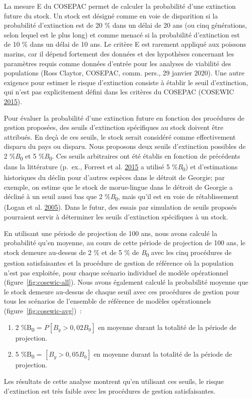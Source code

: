 \documentclass[11pt]{book}
\begin{document}
La mesure E du COSEPAC permet de calculer la probabilité d'une extinction future du stock. Un stock est désigné comme en voie de disparition si la probabilité d'extinction est de 20 \% dans un délai de 20 ans (ou cinq générations, selon lequel est le plus long) et comme menacé si la probabilité d'extinction est de 10 \% dans un délai de 10 ans. Le critère E est rarement appliqué aux poissons marins, car il dépend fortement des données et des hypothèses concernant les paramètres requis comme données d'entrée pour les analyses de viabilité des populations (Ross Claytor, COSEPAC, comm. pers., 29 janvier 2020). Une autre exigence pour estimer le risque d'extinction consiste à établir le seuil d'extinction, qui n'est pas explicitement défini dans les critères du COSEPAC (COSEWIC \protect\hyperlink{ref-cosewic2015}{2015}).

Pour évaluer la probabilité d'une extinction future en fonction des procédures de gestion proposées, des seuils d'extinction spécifiques au stock doivent être attribués. En deçà de ces seuils, le stock serait considéré comme effectivement disparu du pays ou disparu. Nous proposons deux seuils d'extinction possibles de 2 \%\emph{B}\textsubscript{0} et 5 \%\emph{B}\textsubscript{0}. Ces seuils arbitraires ont été établis en fonction de précédents dans la littérature (p.~ex., Forrest et al. \protect\hyperlink{ref-forrest2015}{2015} a utilisé 5 \%\emph{B}\textsubscript{0}) et d'estimations historiques du déclin pour d'autres espèces dans le détroit de Georgie; par exemple, on estime que le stock de morue-lingue dans le détroit de Georgie a décliné à un seuil aussi bas que 2 \%\emph{B}\textsubscript{0}, mais qu'il est en voie de rétablissement (Logan et al. \protect\hyperlink{ref-logan2005}{2005}). Dans le futur, des essais par simulation de seuils proposés pourraient servir à déterminer les seuils d'extinction spécifiques à un stock.

En utilisant une période de projection de 100 ans, nous avons calculé la probabilité qu'en moyenne, au cours de cette période de projection de 100 ans, le stock demeure au-dessus de 2 \% et de 5 \% de \emph{B}\textsubscript{0} avec les cinq procédures de gestion satisfaisantes et la procédure de gestion de référence où la population n'est pas exploitée, pour chaque scénario individuel de modèle opérationnel (figure~\ref{fig:cosewic-all}). Nous avons également calculé la probabilité moyenne que le stock demeure au-dessus de chaque seuil avec ces procédures de gestion pour tous les scénarios de l'ensemble de référence de modèles opérationnels (figure~\ref{fig:cosewic-avg})~:
\begin{enumerate}
\def\labelenumi{\arabic{enumi}.}

\item
  2 \%B\textsubscript{0} = \(P[B_y > 0,02 B_0]\) en moyenne durant la totalité de la période de projection.
\item
  5 \%B\textsubscript{0} = \([B_y > 0,05 B_0]\) en moyenne durant la totalité de la période de projection.
\end{enumerate}
Les résultats de cette analyse montrent qu'en utilisant ces seuils, le risque d'extinction est très faible avec les procédures de gestion satisfaisantes.
\end{document}
